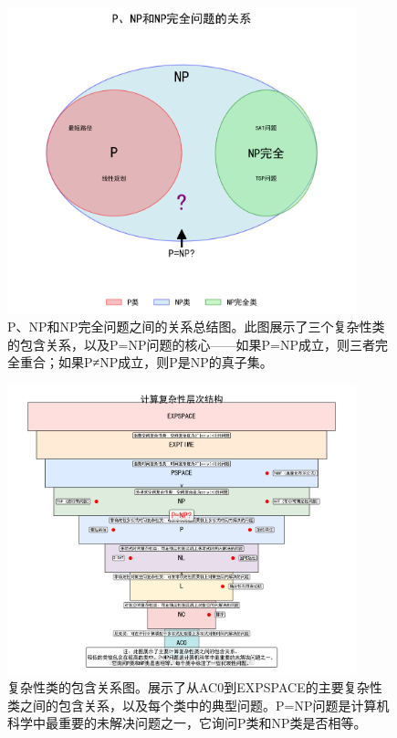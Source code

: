 \documentclass[a4paper,12pt]{ctexart}
\begin{document}
\begin{figure}[H]
    \centering
    \includegraphics[width=0.9\textwidth]{img/pnp_relation.png}
    \caption{P、NP和NP完全问题之间的关系总结图。此图展示了三个复杂性类的包含关系，以及P=NP问题的核心——如果P=NP成立，则三者完全重合；如果P≠NP成立，则P是NP的真子集。}
    \label{fig:pnp_relation}
\end{figure}

\begin{figure}[H]
    \centering
    \includegraphics[width=0.9\textwidth]{img/complexity_hierarchy.png}
    \caption{复杂性类的包含关系图。展示了从AC0到EXPSPACE的主要复杂性类之间的包含关系，以及每个类中的典型问题。P=NP问题是计算机科学中最重要的未解决问题之一，它询问P类和NP类是否相等。}
    \label{fig:complexity_classes}
\end{figure}
\end{document}
